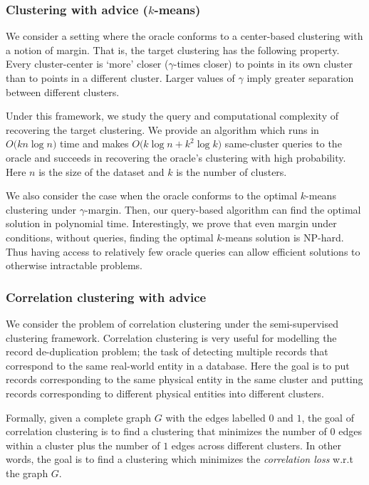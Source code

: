 \documentclass[12pt]{article}
\begin{document}
\subsubsection*{Clustering with advice ($k$-means)}
We consider a setting where the oracle conforms to a center-based clustering with a notion of margin. That is, the target clustering has the following property.  Every cluster-center is `more' closer ($\gamma$-times closer) to points in its own cluster than to points in a different cluster. Larger values of $\gamma$ imply greater separation between different clusters. 

Under this framework, we study the query and computational complexity of recovering the target clustering. We provide an algorithm which runs in $O\big(kn\log n)$ time and makes $O\big(k\log n + k^2 \log k)$ same-cluster queries to the oracle and succeeds in recovering the oracle's clustering with high probability. Here $n$ is the size of the dataset and $k$ is the number of clusters.

We also consider the case when the oracle conforms to the optimal $k$-means clustering under $\gamma$-margin. Then, our query-based algorithm can find the optimal solution in polynomial time. Interestingly, we prove that even margin under conditions, without queries, finding the optimal $k$-means solution is NP-hard. Thus having access to relatively few oracle queries can allow efficient solutions to otherwise intractable problems.

\subsubsection*{Correlation clustering with advice}
We consider the problem of correlation clustering under the semi-supervised clustering framework. Correlation clustering is very useful for modelling the record de-duplication problem; the task of detecting multiple records that correspond to the same real-world entity in a database. Here the goal is to put records corresponding to the same physical entity in the same cluster and putting records corresponding to different physical entities into different clusters.

Formally, given a complete graph $G$ with the edges labelled $0$ and $1$, the goal of correlation clustering is to find a clustering that minimizes the number of $0$ edges within a cluster plus the number of $1$ edges across different clusters. In other words, the goal is to find a clustering which minimizes the \textit{correlation loss} w.r.t the graph $G$. \\
\end{document}
